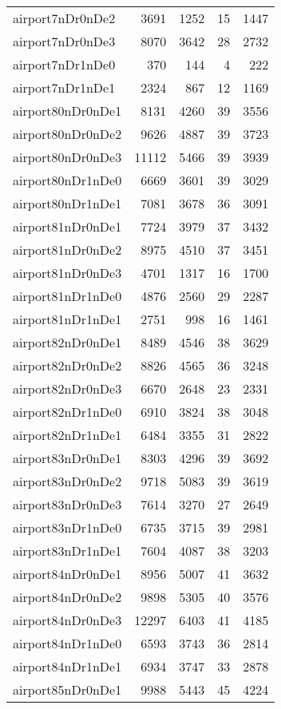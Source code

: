 \begin{longtable}{lrrrr}
airport7nDr0nDe2 & 3691 & 1252 & 15 & 1447 \\
airport7nDr0nDe3 & 8070 & 3642 & 28 & 2732 \\
airport7nDr1nDe0 & 370 & 144 & 4 & 222 \\
airport7nDr1nDe1 & 2324 & 867 & 12 & 1169 \\
airport80nDr0nDe1 & 8131 & 4260 & 39 & 3556 \\
airport80nDr0nDe2 & 9626 & 4887 & 39 & 3723 \\
airport80nDr0nDe3 & 11112 & 5466 & 39 & 3939 \\
airport80nDr1nDe0 & 6669 & 3601 & 39 & 3029 \\
airport80nDr1nDe1 & 7081 & 3678 & 36 & 3091 \\
airport81nDr0nDe1 & 7724 & 3979 & 37 & 3432 \\
airport81nDr0nDe2 & 8975 & 4510 & 37 & 3451 \\
airport81nDr0nDe3 & 4701 & 1317 & 16 & 1700 \\
airport81nDr1nDe0 & 4876 & 2560 & 29 & 2287 \\
airport81nDr1nDe1 & 2751 & 998 & 16 & 1461 \\
airport82nDr0nDe1 & 8489 & 4546 & 38 & 3629 \\
airport82nDr0nDe2 & 8826 & 4565 & 36 & 3248 \\
airport82nDr0nDe3 & 6670 & 2648 & 23 & 2331 \\
airport82nDr1nDe0 & 6910 & 3824 & 38 & 3048 \\
airport82nDr1nDe1 & 6484 & 3355 & 31 & 2822 \\
airport83nDr0nDe1 & 8303 & 4296 & 39 & 3692 \\
airport83nDr0nDe2 & 9718 & 5083 & 39 & 3619 \\
airport83nDr0nDe3 & 7614 & 3270 & 27 & 2649 \\
airport83nDr1nDe0 & 6735 & 3715 & 39 & 2981 \\
airport83nDr1nDe1 & 7604 & 4087 & 38 & 3203 \\
airport84nDr0nDe1 & 8956 & 5007 & 41 & 3632 \\
airport84nDr0nDe2 & 9898 & 5305 & 40 & 3576 \\
airport84nDr0nDe3 & 12297 & 6403 & 41 & 4185 \\
airport84nDr1nDe0 & 6593 & 3743 & 36 & 2814 \\
airport84nDr1nDe1 & 6934 & 3747 & 33 & 2878 \\
airport85nDr0nDe1 & 9988 & 5443 & 45 & 4224 \\

\end{longtable}
